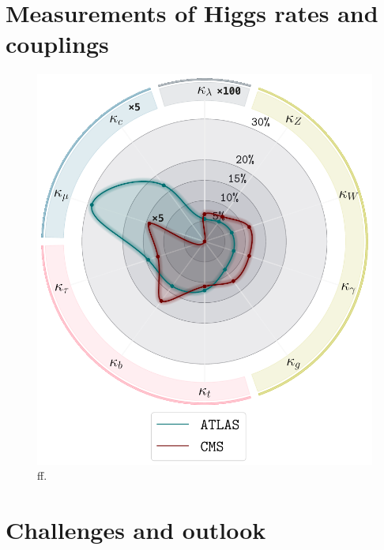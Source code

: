 \section{Measurements of Higgs rates and couplings \label{sec:Higgscoupl} }
\begin{figure}[t!]
	\begin{center}
		\includegraphics[width=12cm]{figures/Higgs_couplings_poster}
		\caption{ff.\label{fig:higgs_kappa} }
	\end{center}
\end{figure}
\newpage
\begingroup
 
\endgroup
\section{Challenges and outlook \label{sec:Higgscouplchallenge} }
